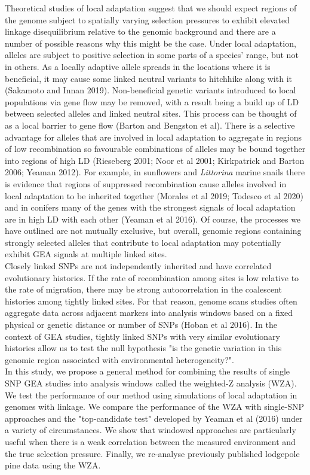 \documentclass[11pt,twoside,lineno]{GSA_format}
\begin{document}
Theoretical studies of local adaptation suggest that we should expect regions of the genome subject to spatially varying selection pressures to exhibit elevated linkage disequilibrium relative to the genomic background and there are a number of possible reasons why this might be the case. Under local adaptation, alleles are subject to positive selection in some parts of a species' range, but not in others. As a locally adaptive allele spreads in the locations where it is beneficial, it may cause some linked neutral variants to hitchhike along with it (Sakamoto and Innan 2019). Non-beneficial genetic variants introduced to local populations via gene flow may be removed, with a result being a build up of LD between selected alleles and linked neutral sites. This process can be thought of as a local barrier to gene flow (Barton and Bengston et al). There is a selective advantage for alleles that are involved in local adaptation to aggregate in regions of low recombination so favourable combinations of alleles may be bound together into regions of high LD (Rieseberg 2001; Noor et al 2001; Kirkpatrick and Barton 2006; Yeaman 2012). For example, in sunflowers and \textit{Littorina} marine snails there is evidence that regions of suppressed recombination cause alleles involved in local adaptation to be inherited together (Morales et al 2019; Todesco et al 2020) and in conifers many of the genes with the strongest signals of local adaptation are in high LD with each other (Yeaman et al 2016). Of course, the processes we have outlined are not mutually exclusive, but overall, genomic regions containing strongly selected alleles that contribute to local adaptation may potentially exhibit GEA signals at multiple linked sites. \\

Closely linked SNPs are not independently inherited and have correlated evolutionary histories. If the rate of recombination among sites is low relative to the rate of migration, there may be strong autocorrelation in the coalescent histories among tightly linked sites. For that reason, genome scans studies often aggregate data across adjacent markers into analysis windows based on a fixed physical or genetic distance or number of SNPs (Hoban et al 2016). In the context of GEA studies, tightly linked SNPs with very similar evolutionary histories allow us to test the null hypothesis "is the genetic variation in this genomic region associated with environmental heterogeneity?". \\

In this study, we propose a general method for combining the results of single SNP GEA studies into analysis windows called the weighted-Z analysis (WZA). We test the performance of our method using simulations of local adaptation in genomes with linkage. We compare the performance of the WZA with single-SNP approaches and the "top-candidate test" developed by Yeaman et al (2016) under a variety of circumstances. We show that windowed approaches are particularly useful when there is a weak correlation between the measured environment and the true selection pressure. Finally, we re-analyse previously published lodgepole pine data using the WZA.
\end{document}
